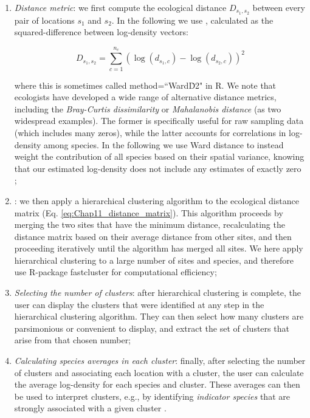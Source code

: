 \begin{enumerate}
    \item \textit{Distance metric}:  we first compute the ecological distance \( D_{s_1,s_2} \) between every pair of locations \(s_1\) and \(s_2\).  In the following we use  \cite{ward_jr_hierarchical_1963}, calculated as the squared-difference between log-density vectors:

\begin{equation} \label{eq:Chap11_distance_matrix}
   D_{s_1,s_2} = \sum_{c=1}^{n_c}\left( \log(d_{s_1,c}) - \log(d_{s_2,c}) \right)^2 
\end{equation}

    where this is sometimes called \colorbox{backcolour}{method=``Ward\.D2"} in R.  We note that ecologists have developed a wide range of alternative distance metrics, including the \textit{Bray-Curtis dissimilarity} \cite{bray_ordination_1957} or \textit{Mahalanobis distance} \cite{mahalanobis_generalised_1936} (as two widespread examples).  The former is specifically useful for raw sampling data (which includes many zeros), while the latter accounts for correlations in log-density among species.  In the following we use Ward distance to instead weight the contribution of all species based on their spatial variance, knowing that our estimated log-density does not include any estimates of exactly zero \cite{thorson_comparison_2019};

    \item {}:  we then apply a hierarchical clustering algorithm to the ecological distance matrix (Eq. \ref{eq:Chap11_distance_matrix}).  This algorithm proceeds by merging the two sites that have the minimum distance, recalculating the distance matrix based on their average distance from other sites, and then proceeding iteratively until the algorithm has merged all sites. We here apply hierarchical clustering to a large number of sites and species, and therefore use R-package \colorbox{backcolour}{fastcluster}\cite{mullner_fastcluster_2013} for computational efficiency;   

    \item \textit{Selecting the number of clusters}:  after hierarchical clustering is complete, the user can display the clusters that were identified at any step in the hierarchical clustering algorithm.  They can then select how many clusters are parsimonious or convenient to display, and extract the set of clusters that arise from that chosen number; 

    \item \textit{Calculating species averages in each cluster}:  finally, after selecting the number of clusters and associating each location with a cluster, the user can calculate the average log-density for each species and cluster.  These averages can then be used to interpret clusters, e.g., by identifying \textit{indicator species} that are strongly associated with a given cluster \cite{dufrene_species_1997}.  
\end{enumerate}

